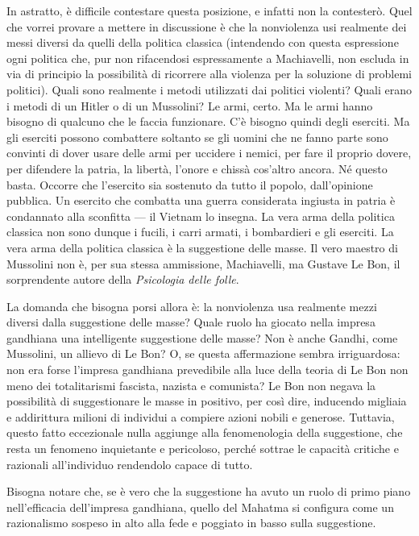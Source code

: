 \documentclass[12pt,oneside,openany]{book}
\begin{document}
In astratto, è difficile contestare questa posizione, e infatti non la contesterò. Quel che vorrei provare a mettere in discussione è che la nonviolenza usi realmente dei messi diversi da quelli della politica classica (intendendo con questa espressione ogni politica che, pur non rifacendosi espressamente a Machiavelli, non escluda in via di principio la possibilità di ricorrere alla violenza per la soluzione di problemi politici). Quali sono realmente i metodi utilizzati dai politici violenti? Quali erano i metodi di un Hitler o di un Mussolini? Le armi, certo. Ma le armi hanno bisogno di qualcuno che le faccia funzionare. C'è bisogno quindi degli eserciti. Ma gli eserciti possono combattere soltanto se gli uomini che ne fanno parte sono convinti di dover usare delle armi per uccidere i nemici, per fare il proprio dovere, per difendere la patria, la libertà, l'onore e chissà cos'altro ancora. Né questo basta. Occorre che l'esercito sia sostenuto da tutto il popolo, dall'opinione pubblica. Un esercito che combatta una guerra considerata ingiusta in patria è condannato alla sconfitta --- il Vietnam lo insegna. La vera arma della politica classica non sono dunque i fucili, i carri armati, i bombardieri e gli eserciti. La vera arma della politica classica è la suggestione delle masse. Il vero maestro di Mussolini non è, per sua stessa ammissione, Machiavelli, ma Gustave Le Bon, il sorprendente autore della \emph{Psicologia delle folle}.



La domanda che bisogna porsi allora è: la nonviolenza usa realmente mezzi diversi dalla suggestione delle masse? Quale ruolo ha giocato nella impresa gandhiana una intelligente suggestione delle masse? Non è anche Gandhi, come Mussolini, un allievo di Le Bon? O, se questa affermazione sembra irriguardosa: non era forse l'impresa gandhiana prevedibile alla luce della teoria di Le Bon non meno dei totalitarismi fascista, nazista e comunista? Le Bon non negava la possibilità di suggestionare le masse in positivo, per così dire, inducendo migliaia e addirittura milioni di individui a compiere azioni nobili e generose. Tuttavia, questo fatto eccezionale nulla aggiunge alla fenomenologia della suggestione, che resta un fenomeno inquietante e pericoloso, perché sottrae le capacità critiche e razionali all'individuo rendendolo capace di tutto.



Bisogna notare che, se è vero che la suggestione ha avuto un ruolo di primo piano nell'efficacia dell'impresa gandhiana, quello del Mahatma si configura come un razionalismo sospeso in alto alla fede e poggiato in basso sulla suggestione.
\end{document}
